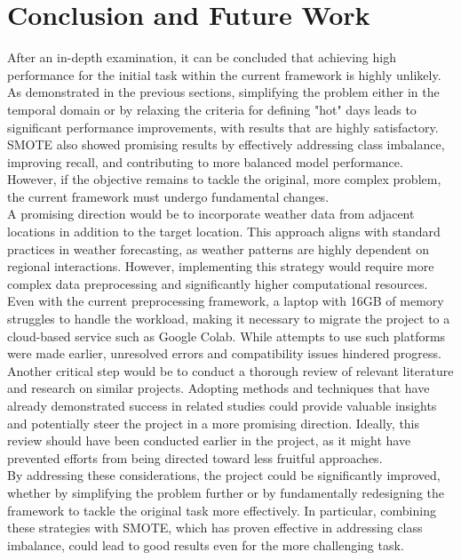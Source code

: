 \documentclass[conference,9pt]{IEEEtran}
\begin{document}
\section{Conclusion and Future Work}
After an in-depth examination, it can be concluded that achieving high performance for the initial task within the current framework is highly unlikely. As demonstrated in the previous sections, simplifying the problem either in the temporal domain or by relaxing the criteria for defining "hot" days leads to significant performance improvements, with results that are highly satisfactory. SMOTE also showed promising results by effectively addressing class imbalance, improving recall, and contributing to more balanced model performance. However, if the objective remains to tackle the original, more complex problem, the current framework must undergo fundamental changes.\\
A promising direction would be to incorporate weather data from adjacent locations in addition to the target location. This approach aligns with standard practices in weather forecasting, as weather patterns are highly dependent on regional interactions. However, implementing this strategy would require more complex data preprocessing and significantly higher computational resources. Even with the current preprocessing framework, a laptop with 16GB of memory struggles to handle the workload, making it necessary to migrate the project to a cloud-based service such as Google Colab. While attempts to use such platforms were made earlier, unresolved errors and compatibility issues hindered progress.\\
Another critical step would be to conduct a thorough review of relevant literature and research on similar projects. Adopting methods and techniques that have already demonstrated success in related studies could provide valuable insights and potentially steer the project in a more promising direction. Ideally, this review should have been conducted earlier in the project, as it might have prevented efforts from being directed toward less fruitful approaches.\\
By addressing these considerations, the project could be significantly improved, whether by simplifying the problem further or by fundamentally redesigning the framework to tackle the original task more effectively. In particular, combining these strategies with SMOTE, which has proven effective in addressing class imbalance, could lead to good results even for the more challenging task.
\end{document}
